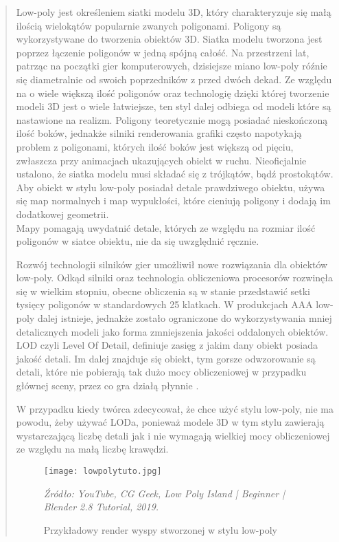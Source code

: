 \begin{quotation}
\indent Low-poly jest określeniem siatki modelu 3D, który charakteryzuje się małą ilością wielokątów popularnie zwanych poligonami. Poligony są wykorzystywane do tworzenia obiektów 3D. Siatka modelu tworzona jest poprzez łączenie poligonów w jedną spójną całość. Na przestrzeni lat, patrząc na początki gier komputerowych, dzisiejsze miano low-poly róźnie się diametralnie od swoich poprzedników z przed dwóch dekad. Ze względu na o wiele większą ilość poligonów oraz technologię dzięki której tworzenie modeli 3D jest o wiele łatwiejsze, ten styl dalej odbiega od modeli które są nastawione na realizm. Poligony teoretycznie mogą posiadać nieskończoną ilość boków, jednakże silniki renderowania grafiki często napotykają problem z poligonami, których ilość boków jest większą od pięciu, zwłaszcza przy animacjach ukazujących obiekt w ruchu. Nieoficjalnie ustalono, że siatka modelu musi składać się z trójkątów, bądź prostokątów. Aby obiekt w stylu low-poly posiadał detale prawdziwego obiektu, używa się map normalnych i map wypukłości, które cieniują poligony i dodają im dodatkowej geometrii. \\
Mapy pomagają uwydatnić detale, których ze względu na rozmiar ilość poligonów w siatce obiektu, nie da się uwzględnić ręcznie.

\indent Rozwój technologii silników gier umożliwił nowe rozwiązania dla obiektów low-poly. Odkąd silniki oraz technologia obliczeniowa procesorów rozwinęła się w wielkim stopniu, obecne obliczenia są w stanie przedstawić setki tysięcy poligonów w standardowych 25 klatkach. 
W produkcjach AAA low-poly dalej istnieje, jednakże zostało ograniczone do wykorzystywania mniej detalicznych modeli jako forma zmniejszenia jakości oddalonych obiektów. LOD czyli Level Of Detail, definiuje zasięg z jakim dany obiekt posiada jakość detali. Im dalej znajduje się obiekt, tym gorsze odwzorowanie są detali, które nie pobierają tak dużo mocy obliczeniowej w przypadku głównej sceny, przez co gra działą płynnie \cite{1}.

\indent W przypadku kiedy twórca zdecycował, że chce użyć stylu low-poly, nie ma powodu, żeby używać LODa, ponieważ modele 3D w tym stylu zawierają wystarczającą liczbę detali jak i nie wymagają wielkiej mocy obliczeniowej ze względu na małą liczbę krawędzi.

\begin{figure}[hbt!]
\centering
  \texttt{[image: lowpolytuto.jpg]}
  \caption{Przykładowy render wyspy stworzonej w stylu low-poly}\label{rys_1}
  \begin{minipage}[t]{0.75\linewidth}
    \emph{Źródło: YouTube, CG Geek, Low Poly Island | Beginner | Blender 2.8 Tutorial, 2019.}
  \end{minipage}
\end{figure}



\end{quotation}
